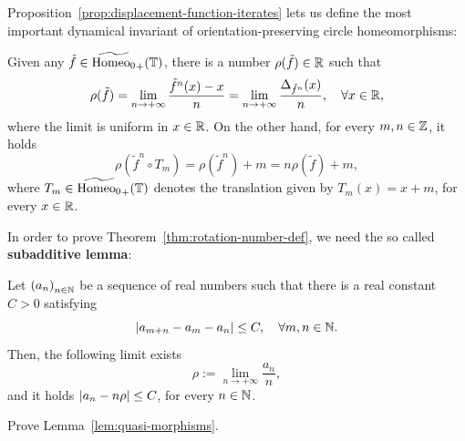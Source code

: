 Proposition~\ref{prop:displacement-function-iterates} lets us define the most important dynamical invariant of orientation-preserving circle homeomorphisms:

\begin{theorem}
  \label{thm:rotation-number-def}
  Given any $\tilde f\in\widetilde{\mathrm{Homeo}_0}_+(\mathbb{T})$, there is a number $\rho(\tilde f)\in\mathbb{R}$ such that
  \begin{equation}
    \label{eq:rotation-number-def}
    \rho(\tilde f)=\lim_{n\to+\infty}\frac{\tilde f^n(x)-x}{n}=\lim_{n\to+\infty} \frac{\Delta_{\tilde f^n}(x)}{n}, \quad\forall x\in\mathbb{R},
  \end{equation}
  where the limit is uniform in $x\in\mathbb{R}$. On the other hand, for every $m,n\in\mathbb{Z}$, it holds
  \begin{displaymath}
    \rho(\tilde f^n\circ T_m)=\rho(\tilde f^n)+m=n\rho(\tilde f)+m,
  \end{displaymath}
  where $T_m\in\widetilde{\mathrm{Homeo}_0}_+(\mathbb{T})$ denotes the translation given by $T_m(x)=x+m$, for every $x\in\mathbb{R}$.
\end{theorem}

In order to prove Theorem~\ref{thm:rotation-number-def}, we need the so called \textbf{subadditive lemma}:

\begin{lemma}\label{lem:quasi-morphisms}
  Let ${(a_{n})}_{n\in\mathbb{N}}$ be a sequence of real numbers such that there is a real constant $C>0$ satisfying
  \begin{displaymath}
    \left\lvert{a_{m+n}-a_{m}-a_{n}}\right\rvert\leq C, \quad\forall m,n\in\mathbb{N}.
  \end{displaymath}
  Then, the following limit exists
  \begin{displaymath}
    \rho:=\lim_{n\to+\infty}\frac{a_{n}}{n},
  \end{displaymath}
  and it holds $\left\lvert{a_{n}-n\rho}\right\rvert\leq C$, for every $n\in\mathbb{N}$.
\end{lemma}

\begin{exercise}
  Prove Lemma~\ref{lem:quasi-morphisms}.
\end{exercise}

